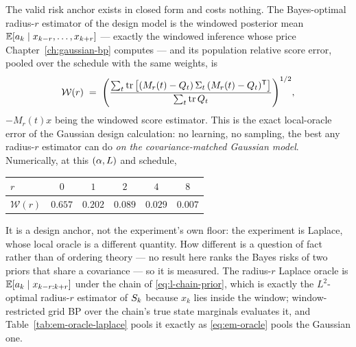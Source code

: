 The valid risk anchor exists in closed form and costs nothing. The
Bayes-optimal radius-$r$ estimator of the design model is the windowed
posterior mean $\mathbb{E}[a_k \mid x_{k-r},\dots,x_{k+r}]$ --- exactly the
windowed inference whose price Chapter~\ref{ch:gaussian-bp} computes --- and
its population relative score error, pooled over the schedule with the same
weights, is
\begin{equation}
  \mathcal{W}(r)
  \;=\;
  \Bigg(
  \frac{\sum_{t} \operatorname{tr}\big[(M_r(t)-Q_t)\,\Sigma_t\,(M_r(t)-Q_t)^{\mathsf{T}}\big]}
       {\sum_{t} \operatorname{tr}Q_t}
  \Bigg)^{1/2},
  \label{eq:em-oracle}
\end{equation}
$-M_r(t)x$ being the windowed score estimator. This is the exact
local-oracle error of the Gaussian design calculation: no learning, no
sampling, the best any radius-$r$ estimator can do \emph{on the
covariance-matched Gaussian model}. Numerically, at this $(\alpha,L)$
and schedule,
\begin{center}
\begin{tabular}{@{}lccccc@{}}
\toprule
$r$ & $0$ & $1$ & $2$ & $4$ & $8$ \\
\midrule
$\mathcal{W}(r)$ & $0.657$ & $0.202$ & $0.089$ & $0.029$ & $0.007$ \\
\bottomrule
\end{tabular}
\end{center}
It is a design anchor, not the experiment's own floor: the experiment is
Laplace, whose local oracle is a different quantity. How different is a
question of fact rather than of ordering theory --- no result here ranks the
Bayes risks of two priors that share a covariance --- so it is measured.
The radius-$r$ Laplace oracle is
$\mathbb{E}[a_k \mid x_{k-r:k+r}]$ under the chain of \eqref{eq:l-chain-prior},
which is exactly the $L^2$-optimal radius-$r$ estimator of $S_k$ because
$x_k$ lies inside the window; window-restricted grid BP over the chain's true
state marginals evaluates it, and Table~\ref{tab:em-oracle-laplace} pools it
exactly as \eqref{eq:em-oracle} pools the Gaussian one.

